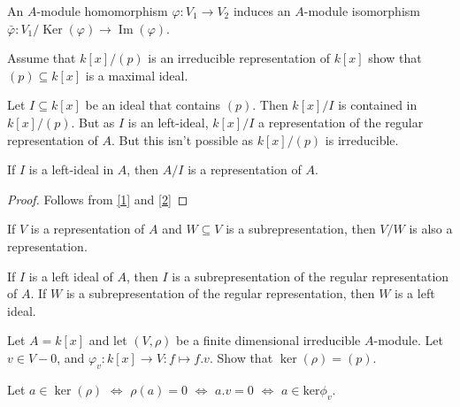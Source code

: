 \begin{thm}
An $A$-module homomorphism $\varphi :V_{1}\rightarrow V_{2}$ induces an $A$-module isomorphism $\bar{\varphi }:V_{1}/\mathop{\mathrm{Ker}}(\varphi ) \rightarrow  \mathop{\mathrm{Im}}(\varphi )$.
\end{thm}


\begin{prop}
Assume that $k[x]/(p)$ is an irreducible representation of $k[x]$ show that $(p)\subseteq k[x]$ is a maximal ideal.
\end{prop}

Let $I\subseteq k[x]$ be an ideal that contains $(p)$. Then $k[x]/I$ is contained in $k[x]/(p)$. But as $I$ is an left-ideal, $k[x]/I$ a representation of the regular representation of $A$. But this isn't possible as $k[x]/(p)$ is irreducible.

\begin{thm}
If $I$ is a left-ideal in $A$, then $A/I$ is a representation of $A$.
\end{thm}

\begin{proof}
Follows from \ref{1} and \ref{2}
\end{proof}

\begin{thm}
\label{1}
If $V$ is a representation of $A$ and $W\subseteq V$ is a subrepresentation, then $V/W$ is also a representation.
\end{thm}

\begin{thm}
	\label{2}
If $I$ is a left ideal of $A$, then $I$ is a subrepresentation of the regular representation of $A$. If $W$ is a subrepresentation of the regular representation, then $W$ is a left ideal.
\end{thm}

\begin{prop}
Let $A=k[x]$ and let $(V,\rho )$ be a finite dimensional irreducible $A$-module. Let $v\in V-0$, and $\varphi _{v}: k[x]\rightarrow V : f \mapsto f.v$. Show that $\mathop{\mathrm{ker}}(\rho )=(p)$.
\end{prop}

Let $a\in \mathop{\mathrm{ker}}(\rho )$ $\Longleftrightarrow $ $\rho (a)=0$ $\Longleftrightarrow $ $a.v=0$ $\Longleftrightarrow $ $a \in  \text{ker}\phi _{v}$.

